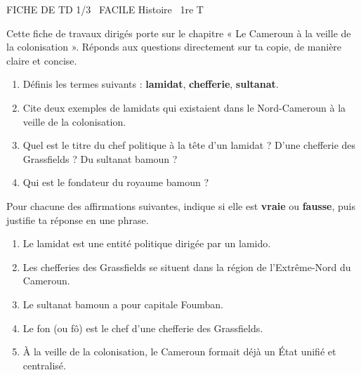 \documentclass[11pt]{article}
\begin{document}
\begin{tcolorbox}[enhanced,colback=popink,colframe=popink,arc=10pt,boxrule=0pt,left=12pt,right=12pt,top=9pt,bottom=9pt]
{\color{white}\popxbold\small FICHE DE TD 1/3 \textbullet\ FACILE \hfill Histoire \textbullet\ 1re T\par}
\end{tcolorbox}
\vspace{4pt}
Cette fiche de travaux dirigés porte sur le chapitre « Le Cameroun à la veille de la colonisation ». Réponds aux questions directement sur ta copie, de manière claire et concise.

\begin{exercice}
\begin{enumerate}
\item Définis les termes suivants : \textbf{lamidat}, \textbf{chefferie}, \textbf{sultanat}.
\item Cite deux exemples de lamidats qui existaient dans le Nord-Cameroun à la veille de la colonisation.
\item Quel est le titre du chef politique à la tête d'un lamidat ? D'une chefferie des Grassfields ? Du sultanat bamoun ?
\item Qui est le fondateur du royaume bamoun ?
\end{enumerate}
\end{exercice}

\begin{exercice}
Pour chacune des affirmations suivantes, indique si elle est \textbf{vraie} ou \textbf{fausse}, puis justifie ta réponse en une phrase.
\begin{enumerate}
\item Le lamidat est une entité politique dirigée par un lamido.
\item Les chefferies des Grassfields se situent dans la région de l'Extrême-Nord du Cameroun.
\item Le sultanat bamoun a pour capitale Foumban.
\item Le fon (ou fô) est le chef d'une chefferie des Grassfields.
\item À la veille de la colonisation, le Cameroun formait déjà un État unifié et centralisé.
\end{enumerate}
\end{exercice}
\end{document}

